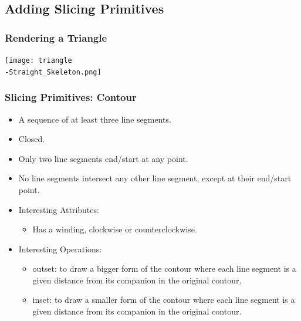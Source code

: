 \documentclass[hyperref={pdfpagemode=FullScreen},aspectratio=169]{beamer}
\begin{document}
\subsection{Adding Slicing Primitives}

\begin{frame}
  \frametitle{Rendering a Triangle}
    \texttt{[image: triangle\\-Straight\_Skeleton.png]}
\end{frame}

\begin{frame}
  \frametitle{Slicing Primitives: Contour}
  \begin{itemize}
  \item A sequence of at least three line segments.
  \item Closed.
  \item Only two line segments end/start at any point.
  \item No line segments intersect any other line segment, except at their end/start point.
  \item Interesting Attributes:
    \begin {itemize}
      \item Has a winding, clockwise or counterclockwise.
    \end{itemize}
  \item Interesting Operations:
    \begin {itemize}
    \item outset: to draw a bigger form of the contour where each line segment is a given distance from its companion in the original contour.
    \item inset: to draw a smaller form of the contour where each line segment is a given distance from its companion in the original contour.
    \end{itemize}
  \end{itemize}
\end{frame}
\end{document}
